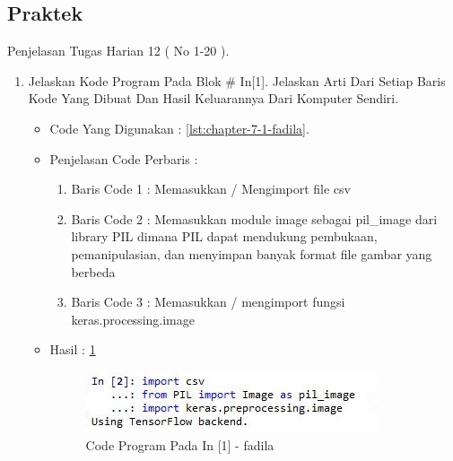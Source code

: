\par
\par
\par
\par
\subsection{Praktek}
Penjelasan Tugas Harian 12 ( No 1-20 ).
\begin{enumerate}
\item Jelaskan Kode Program Pada Blok \# In[1]. Jelaskan Arti Dari Setiap Baris Kode Yang Dibuat Dan Hasil Keluarannya Dari Komputer Sendiri.
\begin{itemize}
\item Code Yang Digunakan : \ref{lst:chapter-7-1-fadila}.

\par
\par
\item Penjelasan Code Perbaris	: 
\begin{enumerate}
\item Baris Code 1	: Memasukkan / Mengimport file csv
\item Baris Code 2	: Memasukkan module image sebagai pil\_image dari library PIL dimana PIL dapat mendukung pembukaan, pemanipulasian, dan menyimpan banyak format file gambar yang berbeda
\item Baris Code 3	: Memasukkan / mengimport fungsi keras.processing.image 
\end{enumerate}
\par
\item Hasil : \ref{chapter-7-in-1-fadila}
\par
\par
\begin{figure}[!hbtp]
\centering
\includegraphics[scale=0.4]{figures/chapter-7-in-1-fadila.jpg}
\caption{Code Program Pada In [1] - fadila}
\label{chapter-7-in-1-fadila}
\end{figure}
\par
\par
\end{itemize}
\par
\par

\end{enumerate}
